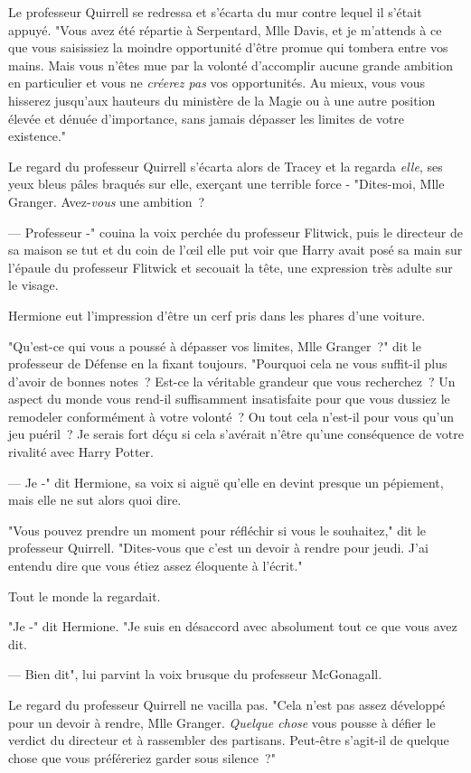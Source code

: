 Le professeur Quirrell se redressa et s'écarta du mur contre lequel il s'était appuyé. "Vous avez été répartie à Serpentard, Mlle Davis, et je m'attends à ce que vous saisissiez la moindre opportunité d'être promue qui tombera entre vos mains. Mais vous n'êtes mue par la volonté d'accomplir aucune grande ambition en particulier et vous ne \emph{créerez pas} vos opportunités. Au mieux, vous vous hisserez jusqu'aux hauteurs du ministère de la Magie ou à une autre position élevée et dénuée d'importance, sans jamais dépasser les limites de votre existence."

Le regard du professeur Quirrell s'écarta alors de Tracey et la regarda \emph{elle}, ses yeux bleus pâles braqués sur elle, exerçant une terrible force - "Dites-moi, Mlle Granger. Avez-\emph{vous} une ambition~?

--- Professeur -" couina la voix perchée du professeur Flitwick, puis le directeur de sa maison se tut et du coin de l'œil elle put voir que Harry avait posé sa main sur l'épaule du professeur Flitwick et secouait la tête, une expression très adulte sur le visage.

Hermione eut l'impression d'être un cerf pris dans les phares d'une voiture.

"Qu'est-ce qui vous a poussé à dépasser vos limites, Mlle Granger~?" dit le professeur de Défense en la fixant toujours. "Pourquoi cela ne vous suffit-il plus d'avoir de bonnes notes~? Est-ce la véritable grandeur que vous recherchez~? Un aspect du monde vous rend-il suffisamment insatisfaite pour que vous dussiez le remodeler conformément à votre volonté~? Ou tout cela n'est-il pour vous qu'un jeu puéril~? Je serais fort déçu si cela s'avérait n'être qu'une conséquence de votre rivalité avec Harry Potter.

--- Je -" dit Hermione, sa voix si aiguë qu'elle en devint presque un pépiement, mais elle ne sut alors quoi dire.

"Vous pouvez prendre un moment pour réfléchir si vous le souhaitez," dit le professeur Quirrell. "Dites-vous que c'est un devoir à rendre pour jeudi. J'ai entendu dire que vous étiez assez éloquente à l'écrit."

Tout le monde la regardait.

"Je -" dit Hermione. "Je suis en désaccord avec absolument tout ce que vous avez dit.

--- Bien dit", lui parvint la voix brusque du professeur McGonagall.

Le regard du professeur Quirrell ne vacilla pas. "Cela n'est pas assez développé pour un devoir à rendre, Mlle Granger. \emph{Quelque chose} vous pousse à défier le verdict du directeur et à rassembler des partisans. Peut-être s'agit-il de quelque chose que vous préféreriez garder sous silence~?"

